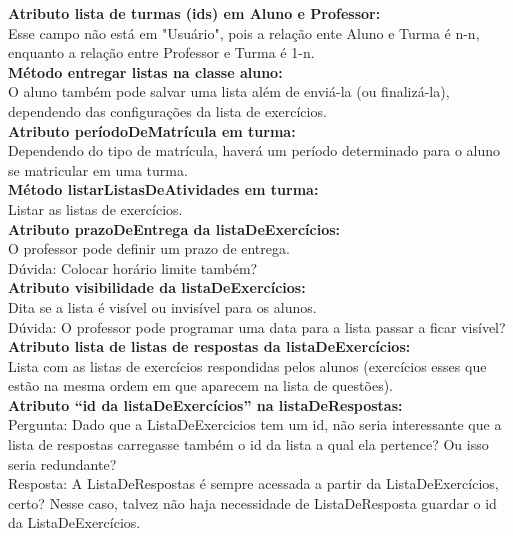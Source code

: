 \documentclass[12pt,letterpaper]{article}
\begin{document}
\textbf{Atributo lista de turmas (ids) em Aluno e Professor:}\\
Esse campo não está em "Usuário", pois a relação ente Aluno e Turma é n-n, enquanto a relação entre Professor e Turma é 1-n.\\


\textbf{Método entregar listas na classe aluno:}\\
O aluno também pode salvar uma lista além de enviá-la (ou finalizá-la), dependendo das configurações da lista de exercícios.\\


\textbf{Atributo períodoDeMatrícula em turma:}\\
Dependendo do tipo de matrícula, haverá um período determinado para o aluno se matricular em uma turma.\\


\textbf{Método listarListasDeAtividades em turma:}\\
Listar as listas de exercícios.\\


\textbf{Atributo prazoDeEntrega da listaDeExercícios:}\\
O professor pode definir um prazo de entrega.\\
Dúvida: Colocar horário limite também?\\


\textbf{Atributo visibilidade da listaDeExercícios:}\\
Dita se a lista é visível ou invisível para os alunos.\\
Dúvida: O professor pode programar uma data para a lista passar a ficar visível?\\


\textbf{Atributo lista de listas de respostas da listaDeExercícios:}\\
Lista com as listas de exercícios respondidas pelos alunos (exercícios esses que estão na mesma ordem em que aparecem na lista de questões).\\


\textbf{Atributo “id da listaDeExercícios” na listaDeRespostas: }\\
Pergunta: Dado que a ListaDeExercicios tem um id, não seria interessante que a lista de respostas carregasse também o id da lista a qual ela pertence? Ou isso seria redundante?\\

Resposta: A ListaDeRespostas é sempre acessada a partir da ListaDeExercícios, certo? Nesse caso, talvez não haja necessidade de ListaDeResposta guardar o id da ListaDeExercícios.\\
\end{document}
